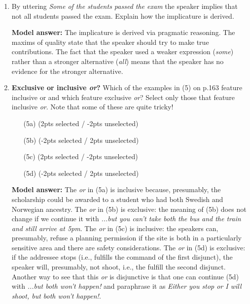 \documentclass[a4,11pt]{article}
\newcommand{\6}{\mbox{$[\hspace*{-.6mm}[$}}
\newcommand{\9}{\mbox{$]\hspace*{-.6mm}]$}}
\begin{document}
\begin{enumerate}[leftmargin = 12pt]
\item By uttering {\it Some of the students passed the exam} the speaker implies that not all students passed the exam. Explain how the implicature is derived.

{ \bf Model answer:}  The implicature is derived via pragmatic reasoning. The maxims of quality state that the speaker should try to make true contributions. The fact that the speaker used a weaker expression (\textit{some}) rather than a stronger alternative (\textit{all}) means that the speaker has no evidence for the stronger alternative. 

\item {\bf Exclusive or inclusive {\em or}?} Which of the examples in (5) on p.163 feature inclusive or and which feature exclusive {\em or}? Select only those that feature inclusive {\em or}. Note that some of these are quite tricky! 

\begin{enumerate}[noitemsep]
\item[(5a)] (2pts selected / -2pts unselected)
\item[(5b)] (-2pts selected / 2pts unselected)
\item[(5c)] (2pts selected / -2pts unselected)
\item[(5d)] (-2pts selected / 2pts unselected)
\end{enumerate}

{\bf Model answer:} The {\em or} in (5a) is inclusive because, presumably, the scholarship could be awarded to a student who had both Swedish and Norwegian ancestry. The {\em or} in (5b) is exclusive: the meaning of (5b) does not change if we continue it with {\em ...but you can't take both the bus and the train and still arrive at 5pm}. The {\em or} in (5c) is inclusive: the speakers can, presumably, refuse a planning permission if the site is both in a particularly sensitive area and there are safety considerations. The {\em or} in (5d) is exclusive: if the addressee stops (i.e., fulfills the command of the first disjunct), the speaker will, presumably, not shoot, i.e., the fulfill the second disjunct. Another way to see that this {\em or} is disjunctive is that one can continue (5d) with {\em ...but both won't happen!} and paraphrase it as {\em Either you stop or I will shoot, but both won't happen!}. 

\end{enumerate}
\end{document}
